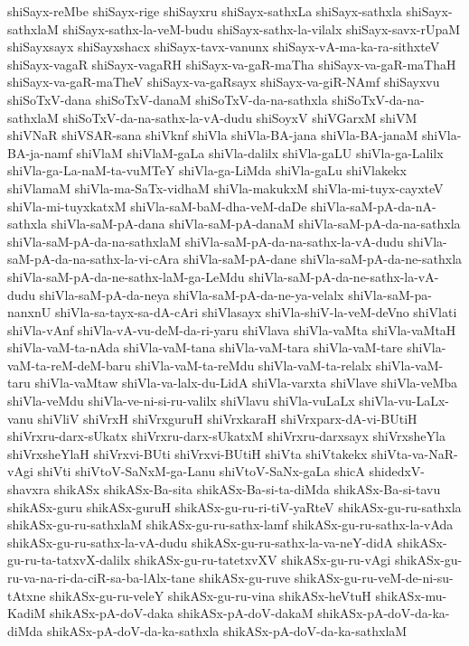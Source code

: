{shiSayx-reMbe
shiSayx-rige
shiSayxru
shiSayx-sathxLa
shiSayx-sathxla
shiSayx-sathxlaM
shiSayx-sathx-la-veM-budu
shiSayx-sathx-la-vilalx
shiSayx-savx-rUpaM
shiSayxsayx
shiSayxshacx
shiSayx-tavx-vanunx
shiSayx-vA-ma-ka-ra-sithxteV
shiSayx-vagaR
shiSayx-vagaRH
shiSayx-va-gaR-maTha
shiSayx-va-gaR-maThaH
shiSayx-va-gaR-maTheV
shiSayx-va-gaRsayx
shiSayx-va-giR-NAmf
shiSayxvu
shiSoTxV-dana
shiSoTxV-danaM
shiSoTxV-da-na-sathxla
shiSoTxV-da-na-sathxlaM
shiSoTxV-da-na-sathx-la-vA-dudu
shiSoyxV
shiVGarxM
shiVM
shiVNaR
shiVSAR-sana
shiVknf
shiVla
shiVla-BA-jana
shiVla-BA-janaM
shiVla-BA-ja-namf
shiVlaM
shiVlaM-gaLa
shiVla-dalilx
shiVla-gaLU
shiVla-ga-Lalilx
shiVla-ga-La-naM-ta-vuMTeY
shiVla-ga-LiMda
shiVla-gaLu
shiVlakekx
shiVlamaM
shiVla-ma-SaTx-vidhaM
shiVla-makukxM
shiVla-mi-tuyx-cayxteV
shiVla-mi-tuyxkatxM
shiVla-saM-baM-dha-veM-daDe
shiVla-saM-pA-da-nA-sathxla
shiVla-saM-pA-dana
shiVla-saM-pA-danaM
shiVla-saM-pA-da-na-sathxla
shiVla-saM-pA-da-na-sathxlaM
shiVla-saM-pA-da-na-sathx-la-vA-dudu
shiVla-saM-pA-da-na-sathx-la-vi-cAra
shiVla-saM-pA-dane
shiVla-saM-pA-da-ne-sathxla
shiVla-saM-pA-da-ne-sathx-laM-ga-LeMdu
shiVla-saM-pA-da-ne-sathx-la-vA-dudu
shiVla-saM-pA-da-neya
shiVla-saM-pA-da-ne-ya-velalx
shiVla-saM-pa-nanxnU
shiVla-sa-tayx-sa-dA-cAri
shiVlasayx
shiVla-shiV-la-veM-deVno
shiVlati
shiVla-vAnf
shiVla-vA-vu-deM-da-ri-yaru
shiVlava
shiVla-vaMta
shiVla-vaMtaH
shiVla-vaM-ta-nAda
shiVla-vaM-tana
shiVla-vaM-tara
shiVla-vaM-tare
shiVla-vaM-ta-reM-deM-baru
shiVla-vaM-ta-reMdu
shiVla-vaM-ta-relalx
shiVla-vaM-taru
shiVla-vaMtaw
shiVla-va-lalx-du-LidA
shiVla-varxta
shiVlave
shiVla-veMba
shiVla-veMdu
shiVla-ve-ni-si-ru-valilx
shiVlavu
shiVla-vuLaLx
shiVla-vu-LaLx-vanu
shiVliV
shiVrxH
shiVrxguruH
shiVrxkaraH
shiVrxparx-dA-vi-BUtiH
shiVrxru-darx-sUkatx
shiVrxru-darx-sUkatxM
shiVrxru-darxsayx
shiVrxsheYla
shiVrxsheYlaH
shiVrxvi-BUti
shiVrxvi-BUtiH
shiVta
shiVtakekx
shiVta-va-NaR-vAgi
shiVti
shiVtoV-SaNxM-ga-Lanu
shiVtoV-SaNx-gaLa
shicA
shidedxV-shavxra
shikASx
shikASx-Ba-sita
shikASx-Ba-si-ta-diMda
shikASx-Ba-si-tavu
shikASx-guru
shikASx-guruH
shikASx-gu-ru-ri-tiV-yaRteV
shikASx-gu-ru-sathxla
shikASx-gu-ru-sathxlaM
shikASx-gu-ru-sathx-lamf
shikASx-gu-ru-sathx-la-vAda
shikASx-gu-ru-sathx-la-vA-dudu
shikASx-gu-ru-sathx-la-va-neY-didA
shikASx-gu-ru-ta-tatxvX-dalilx
shikASx-gu-ru-tatetxvXV
shikASx-gu-ru-vAgi
shikASx-gu-ru-va-na-ri-da-ciR-sa-ba-lAlx-tane
shikASx-gu-ruve
shikASx-gu-ru-veM-de-ni-su-tAtxne
shikASx-gu-ru-veleY
shikASx-gu-ru-vina
shikASx-heVtuH
shikASx-mu-KadiM
shikASx-pA-doV-daka
shikASx-pA-doV-dakaM
shikASx-pA-doV-da-ka-diMda
shikASx-pA-doV-da-ka-sathxla
shikASx-pA-doV-da-ka-sathxlaM
}
